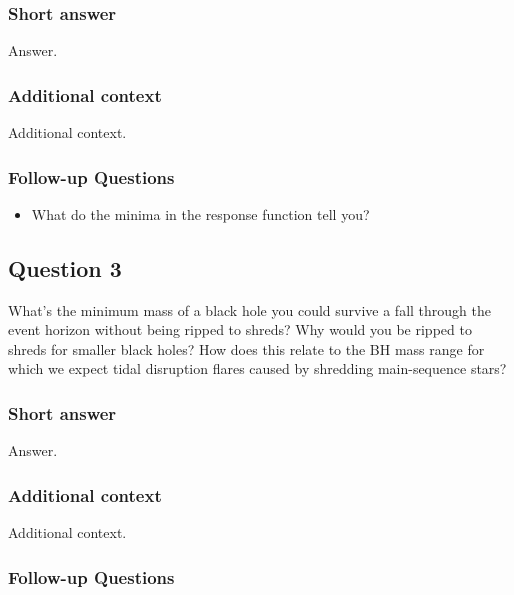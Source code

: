 \documentclass[a4paper,10pt]{article}
\begin{document}
\subsubsection{Short answer}

Answer.

\subsubsection{Additional context}

Additional context.

\subsubsection{Follow-up Questions}

\begin{itemize}
    \item What do the minima in the response function tell you?
\end{itemize}


\newpage
\subsection{Question 3}

What's the minimum mass of a black hole you could survive a fall through the event horizon without being ripped to shreds? Why would you be ripped to shreds for smaller black holes? How does this relate to the BH mass range for which we expect tidal disruption flares caused by shredding main-sequence stars?

\subsubsection{Short answer}

Answer.

\subsubsection{Additional context}

Additional context.

\subsubsection{Follow-up Questions}
\end{document}
